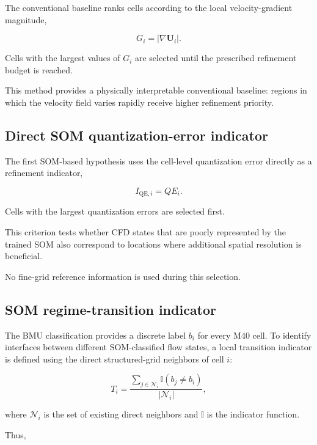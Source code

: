 The conventional baseline ranks cells according to the local velocity-gradient
magnitude,

\begin{equation}
G_i = |\nabla\mathbf{U}_i|.
\end{equation}

Cells with the largest values of \(G_i\) are selected until the prescribed
refinement budget is reached.

This method provides a physically interpretable conventional baseline:
regions in which the velocity field varies rapidly receive higher refinement
priority.

\subsection{Direct SOM quantization-error indicator}

The first SOM-based hypothesis uses the cell-level quantization error directly
as a refinement indicator,

\begin{equation}
I_{\mathrm{QE},i}=QE_i.
\end{equation}

Cells with the largest quantization errors are selected first.

This criterion tests whether CFD states that are poorly represented by the
trained SOM also correspond to locations where additional spatial resolution
is beneficial.

No fine-grid reference information is used during this selection.

\subsection{SOM regime-transition indicator}

The BMU classification provides a discrete label \(b_i\) for every M40 cell.
To identify interfaces between different SOM-classified flow states, a local
transition indicator is defined using the direct structured-grid neighbors of
cell \(i\):

\begin{equation}
T_i =
\frac{
\displaystyle
\sum_{j\in\mathcal{N}_i}
\mathbb{I}(b_j\neq b_i)
}{
|\mathcal{N}_i|
},
\end{equation}

where \(\mathcal{N}_i\) is the set of existing direct neighbors and
\(\mathbb{I}\) is the indicator function.

Thus,

